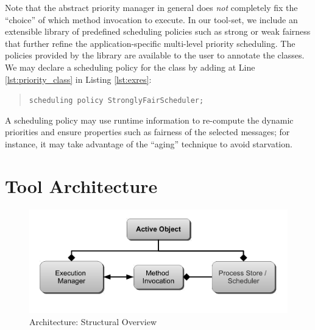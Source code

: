 Note that the abstract priority manager in general does \textit{not} completely
fix the ``choice'' of which method invocation to execute. 
In our tool-set, we include an extensible library of predefined scheduling policies such as strong or weak fairness that further refine the application-specific multi-level priority scheduling. 
The policies provided by the library are available to the user to annotate the classes.
We may declare a scheduling policy for the  class by adding at Line
\ref{lst:priority_class} in Listing \ref{lst:exres}: 
%
\begin{quote}
\lstinline{scheduling policy StronglyFairScheduler;} 
\end{quote} 

A scheduling policy may
use runtime information to re-compute the dynamic priorities and ensure
properties such as fairness of the selected messages; for instance, it may
take advantage of the ``aging'' technique to avoid starvation. 



\section{Tool Architecture} \label{sec:compiler}


\begin{figure}[t]
\begin{center}
  \includegraphics[scale=0.36]{figs/manticore-concurrency-v4}
  \caption{\Crisp Architecture: Structural Overview}
  \label{fig:api}
\end{center}
\end{figure}

